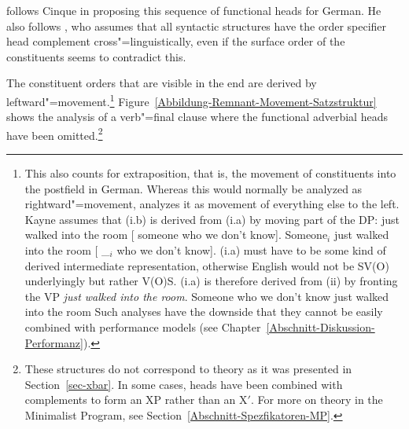 \citet{Laenzlinger2004a} follows Cinque in proposing this sequence of functional heads for German. He also follows \citet{Kayne94a-u}, who assumes
that all syntactic structures have the order specifier head complement cross"=linguistically, even if the surface order of the constituents
seems to contradict this.%

The constituent orders that are visible in the end are derived by leftward"=movement.\footnote{\label{fn-Kayne-Extraposition}%
	This also counts for extraposition, that is, the movement of constituents into the postfield
	in German. Whereas this would normally be analyzed as rightward"=movement, \citet[Chapter~9]{Kayne94a-u} analyzes
	it as movement of everything else to the left. Kayne assumes that (i.b) is derived from (i.a) by moving part of the 
	DP:
\eal
\ex just walked into the room [ someone who we don't know].
\ex Someone$_i$ just walked into the room [ \_$_i$ who we don't know].
\zl
(i.a) must have to be some kind of derived intermediate representation, otherwise English would not be SV(O) underlyingly but rather V(O)S.
(i.a) is therefore derived from (ii) by fronting the VP \emph{just walked into the room}.
\ea
Someone who we don't know just walked into the room
\z
Such analyses have the downside that they cannot be easily combined with performance models (see Chapter~\ref{Abschnitt-Diskussion-Performanz}).%
} 
Figure~\vref{Abbildung-Remnant-Movement-Satzstruktur} shows the analysis of a verb"=final clause where the functional adverbial heads have been
omitted.\footnote{%
	These structures do not correspond to \xbar theory as it was presented in Section~\ref{sec-xbar}. In some cases, heads have been combined
	with complements to form an XP rather than an X$'$. For more on \xbar theory in the Minimalist Program, 
	see Section~\ref{Abschnitt-Spezfikatoren-MP}.
}
